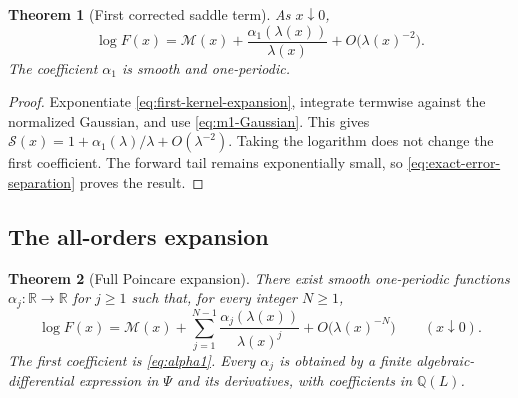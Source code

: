 \documentclass[11pt,oneside]{article}
\newtheorem{theorem}{Theorem}[section]
\theoremstyle{definition}
\theoremstyle{remark}
\newcommand{\Q}{\mathbb Q}
\newcommand{\R}{\mathbb R}
\newcommand{\Lam}{\lambda}
\newcommand{\Ltwo}{L}
\newcommand{\PsiPer}{\Psi}
\begin{document}
\begin{theorem}[First corrected saddle term]\label{thm:first-saddle-correction}
As $x\downarrow0$,
\begin{equation}\label{eq:first-saddle-correction}
 \log F(x)=\mathcal M(x)
 +\frac{\alpha_1(\Lam(x))}{\Lam(x)}
 +O\bigl(\Lam(x)^{-2}\bigr).
\end{equation}
The coefficient $\alpha_1$ is smooth and one-periodic.
\end{theorem}

\begin{proof}
Exponentiate \eqref{eq:first-kernel-expansion}, integrate termwise against the
normalized Gaussian, and use \eqref{eq:m1-Gaussian}.  This gives
$\mathcal S(x)=1+\alpha_1(\Lam)/\Lam+O(\Lam^{-2})$.  Taking the logarithm does not
change the first coefficient.  The forward tail remains exponentially small, so
\eqref{eq:exact-error-separation} proves the result.
\end{proof}

\subsection{The all-orders expansion}

\begin{theorem}[Full Poincare expansion]\label{thm:full-asymptotic}
There exist smooth one-periodic functions $\alpha_j\colon\R\to\R$ for $j\ge1$
such that, for every integer $N\ge1$,
\begin{equation}\label{eq:full-asymptotic}
 \log F(x)=\mathcal M(x)
 +\sum_{j=1}^{N-1}\frac{\alpha_j(\Lam(x))}{\Lam(x)^j}
 +O\bigl(\Lam(x)^{-N}\bigr)
 \qquad(x\downarrow0).
\end{equation}
The first coefficient is \eqref{eq:alpha1}.  Every $\alpha_j$ is obtained by a
finite algebraic-differential expression in $\PsiPer$ and its derivatives, with
coefficients in $\Q(\Ltwo)$.
\end{theorem}
\end{document}

